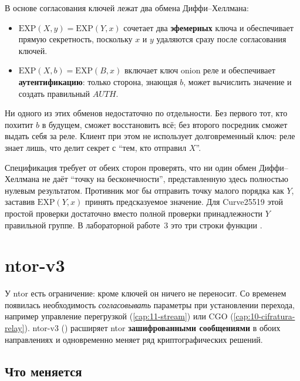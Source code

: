 В основе согласования ключей лежат два обмена Диффи--Хеллмана:
\begin{itemize}
  \item $\mathrm{EXP}(X, y) = \mathrm{EXP}(Y, x)$ сочетает два \textbf{эфемерных} ключа и обеспечивает прямую секретность, поскольку $x$ и $y$ удаляются сразу после согласования ключей.
  \item $\mathrm{EXP}(X, b) = \mathrm{EXP}(B, x)$ включает ключ onion реле и обеспечивает \textbf{аутентификацию}: только сторона, знающая $b$, может вычислить значение и создать правильный $\mathit{AUTH}$.
\end{itemize}
Ни одного из этих обменов недостаточно по отдельности. Без первого тот, кто похитит $b$ в будущем, сможет восстановить всё; без второго посредник сможет выдать себя за реле. Клиент при этом не использует долговременный ключ: реле знает лишь, что делит секрет с \enquote{тем, кто отправил $X$}.

\begin{approfondimento}
Спецификация требует от обеих сторон проверять, что ни один обмен Диффи--Хеллмана не даёт \enquote{точку на бесконечности}, представленную здесь полностью нулевым результатом. Противник мог бы отправить точку малого порядка как $Y$, заставив $\mathrm{EXP}(Y, x)$ принять предсказуемое значение. Для Curve25519 этой простой проверки достаточно вместо полной проверки принадлежности $Y$ правильной группе. В лабораторной работе~3 это три строки функции .
\end{approfondimento}

\section{ntor-v3}\label{sec:ntor3}

У ntor есть ограничение: кроме ключей он ничего не переносит. Со временем появилась необходимость \emph{согласовывать} параметры при установлении перехода, например управление перегрузкой (\cref{cap:11-stream}) или CGO (\cref{cap:10-cifratura-relay}). ntor-v3 () расширяет ntor \textbf{зашифрованными сообщениями} в обоих направлениях и одновременно меняет ряд криптографических решений.

\subsection{Что меняется}

